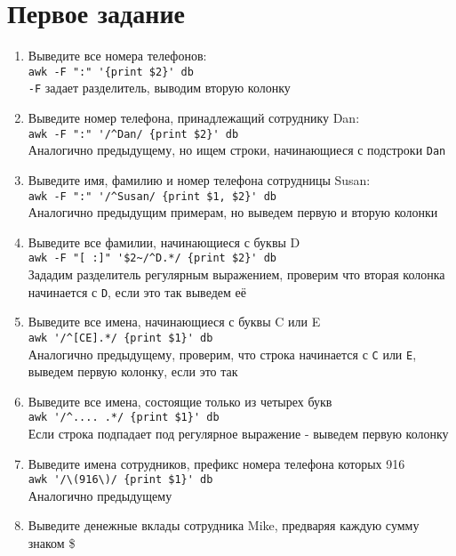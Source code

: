 \documentclass[12pt, a4paper]{article}
\begin{document}

\section*{Первое задание}
\begin{enumerate}
  \item Выведите все номера телефонов:\\
    \verb|awk -F ":" '{print $2}' db|\\
    \verb|-F| задает разделитель, выводим вторую колонку
  \item Выведите номер телефона, принадлежащий сотруднику Dan:\\
    \verb|awk -F ":" '/^Dan/ {print $2}' db|\\
    Аналогично предыдущему, но ищем строки, начинающиеся с подстроки \verb|Dan|
  \item Выведите имя, фамилию и номер телефона сотрудницы Susan:\\
    \verb|awk -F ":" '/^Susan/ {print $1, $2}' db|\\
    Аналогично предыдущим примерам, но выведем первую и вторую колонки
  \item Выведите все фамилии, начинающиеся с буквы D\\
    \verb|awk -F "[ :]" '$2~/^D.*/ {print $2}' db|\\
    Зададим разделитель регулярным выражением, проверим что вторая колонка
    начинается с \verb|D|, если это так выведем её
  \item Выведите все имена, начинающиеся с буквы C или E\\
    \verb|awk '/^[CE].*/ {print $1}' db|\\
    Аналогично предыдущему, проверим, что строка начинается с \verb|C| или
    \verb|E|, выведем первую колонку, если это так
  \item Выведите все имена, состоящие только из четырех букв\\
    \verb|awk '/^.... .*/ {print $1}' db|\\
    Если строка подпадает под регулярное выражение - выведем первую колонку
  \item Выведите имена сотрудников, префикс номера телефона которых 916\\
    \verb|awk '/\(916\)/ {print $1}' db|\\
    Аналогично предыдущему
  \item Выведите денежные вклады сотрудника Mike, предваряя каждую сумму знаком \$\\

\end{enumerate}
\end{document}
